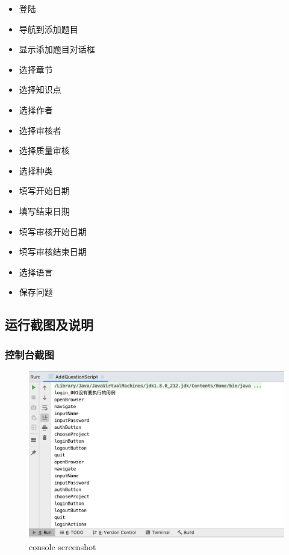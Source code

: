 \documentclass[hyperref, a4paper]{ctexart}
\providecommand{\tightlist}{%
  \setlength{\itemsep}{0pt}\setlength{\parskip}{0pt}}
\begin{document}
\begin{itemize}
\tightlist
\item
  登陆
\item
  导航到添加题目
\item
  显示添加题目对话框
\item
  选择章节
\item
  选择知识点
\item
  选择作者
\item
  选择审核者
\item
  选择质量审核
\item
  选择种类
\item
  填写开始日期
\item
  填写结束日期
\item
  填写审核开始日期
\item
  填写审核结束日期
\item
  选择语言
\item
  保存问题
\end{itemize}

\hypertarget{ux8fd0ux884cux622aux56feux53caux8bf4ux660e}{%
\subsection{运行截图及说明}\label{ux8fd0ux884cux622aux56feux53caux8bf4ux660e}}

\hypertarget{ux63a7ux5236ux53f0ux622aux56fe}{%
\subsubsection{控制台截图}\label{ux63a7ux5236ux53f0ux622aux56fe}}

\begin{figure}
  \centering
  \includegraphics[scale=0.33]{./screenshots/console.jpg}
  \caption{console screenshot}\label{4}
\end{figure}
\end{document}
